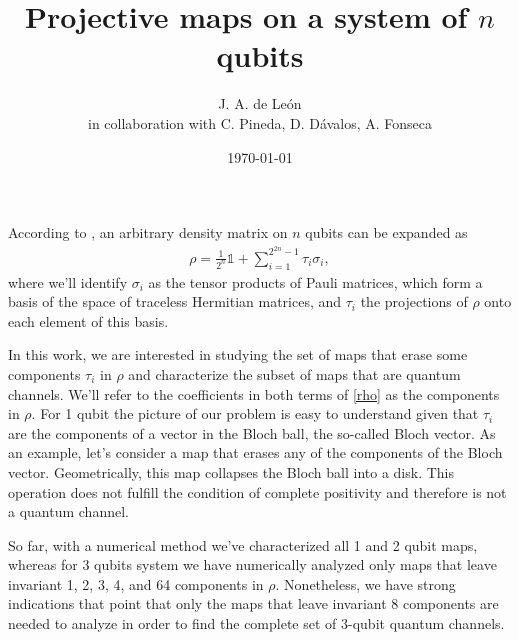 \documentclass[11pt,dvipsnames]{article} %
\newcommand{\1}{\mathds{1}}
\begin{document}
\title{Projective maps on a system of $n$ qubits} 
\author{J. A. de León\\ \small{in collaboration with C. Pineda, D. Dávalos, A. Fonseca}}


\date{\today}  

\maketitle
According to \cite{bengtsson_zyczkowski_2017}, an arbitrary density matrix on $n$  
qubits can be expanded as
\begin{align}
  \rho = \frac{1}{2^n}\1 + \sum _{i=1}^{2^{2n}-1}\tau _i\sigma _i,
	\label{rho}
\end{align}
where we'll identify $\sigma _i$ as the tensor products of Pauli 
matrices, which form a basis of the space of traceless Hermitian
matrices, and 
$\tau_i$ the projections of $\rho$ onto each element of this basis.



In this work, we are interested in studying the set of maps that erase
some components $\tau_i$ in $\rho$ and characterize the subset of maps
that are quantum channels. We'll refer to the coefficients in both terms of 
\eqref{rho} as the components in $\rho$. 
For 1 qubit the picture of our problem is easy to understand given that 
$\tau_i$ are the components of a vector in the Bloch ball, the so-called
Bloch vector. As an example, let's consider a map that erases any of the 
components of the Bloch vector. Geometrically, this map collapses 
the Bloch ball into a disk. This operation does not fulfill 
the condition of complete positivity and therefore is not a quantum channel.  


So far, with a numerical method we've characterized all 1 and 2 qubit maps, 
whereas for 3 qubits system we have numerically analyzed only maps that leave 
invariant 1, 2, 3, 4, and 64 components in $\rho$. Nonetheless, we have strong
indications that point that only the maps that leave invariant 8 components are 
needed to analyze in order to find the complete set of 3-qubit quantum 
channels.
\end{document}
